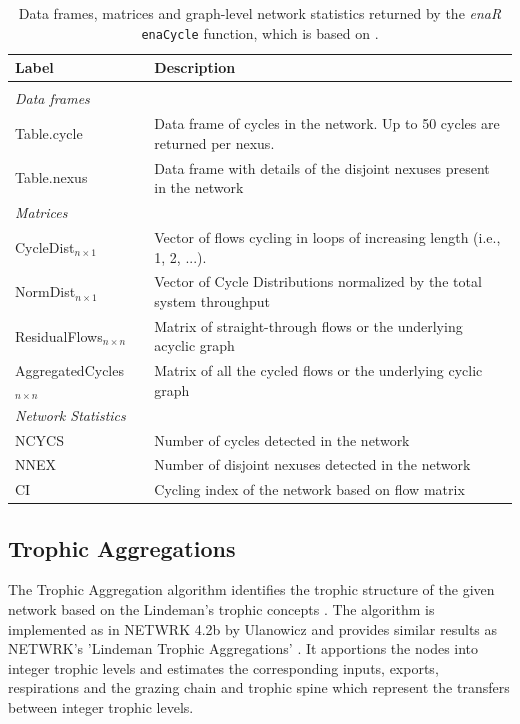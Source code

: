 \documentclass[article]{jss}
\begin{document}
 \begin{table}[t]
  \caption{Data frames, matrices and graph-level network statistics returned by the \textit{enaR}    %
    \texttt{enaCycle} function, which is based on \citep{ulanowicz83}.}\label{tab:cycle}
  \center
  \begin{small}
    \begin{tabular}{l p{10 cm}}
      \textbf{Label} & \textbf{Description} \\ \hline \\[-1.5ex]
      \multicolumn{2}{l}{\textit{Data frames}} \\[1ex]
      Table.cycle & Data frame of cycles in the network. Up to 50
      cycles are returned per nexus.  \\
      Table.nexus & Data frame with details of the disjoint nexuses present in the network\\[1ex]
      \multicolumn{2}{l}{\textit{Matrices}} \\[1ex]
      CycleDist$_{n \times 1}$ & Vector of flows cycling in loops of
      increasing length (i.e., 1, 2, ...). \\  %
      NormDist$_{n \times 1}$ & Vector of Cycle Distributions normalized by the total system throughput \\
      ResidualFlows$_{n \times n}$ & Matrix of straight-through flows or the underlying acyclic graph\\
      AggregatedCycles$_{n \times n}$ & Matrix of all the cycled flows or the underlying cyclic graph\\[1ex]
      \multicolumn{2}{l}{\textit{Network Statistics}} \\[1ex]
      NCYCS & Number of cycles detected in the network\\
      NNEX & Number of disjoint nexuses detected in the network\\
      CI & Cycling index of the network based on flow matrix\\ \hline
\end{tabular}
\end{small}
\end{table}


\subsection{Trophic Aggregations}
The Trophic Aggregation algorithm identifies the trophic structure
of the given network based on the Lindeman's trophic concepts
\citep{lindeman42}. The algorithm is implemented as in NETWRK 4.2b
by Ulanowicz \citep{ulanowicz1979trophic} and provides similar
results as NETWRK's 'Lindeman Trophic Aggregations' \citep{ulanowicz91}.
It apportions the nodes into integer trophic levels and estimates the
corresponding inputs, exports, respirations and the grazing chain and
trophic spine which represent the transfers between integer trophic levels.
\end{document}
